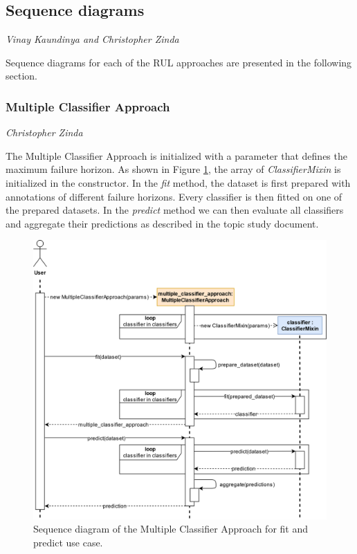 \subsection*{Sequence diagrams}
\vspace*{-12.5mm}\hfill{\normalsize\emph{Vinay Kaundinya and Christopher Zinda}}

Sequence diagrams for each of the RUL approaches are presented in the following section.

\subsubsection*{Multiple Classifier Approach}
\vspace*{-12.5mm}\hfill{\normalsize\emph{Christopher Zinda}}

The Multiple Classifier Approach is initialized with a parameter that defines the maximum failure horizon. As shown in Figure \ref{fig:rul_seq_multiple_classifier}, the array of \textit{ClassifierMixin} is initialized in the constructor. In the \textit{fit} method, the dataset is first prepared with annotations of different failure horizons. Every classifier is then fitted on one of the prepared datasets. In the \textit{predict} method we can then evaluate all classifiers and aggregate their predictions as described in the topic study document.
\begin{figure}[H]
    \centering
    \includegraphics[width=\textwidth]{gfx/rul_seq_multiple_classifier}
    \caption{Sequence diagram of the Multiple Classifier Approach for fit and predict use case.}
    \label{fig:rul_seq_multiple_classifier}
\end{figure}

